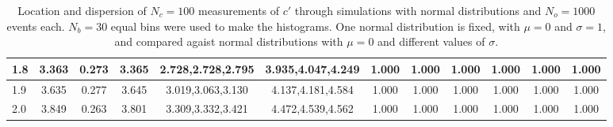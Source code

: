 \begin{table*}[h!]
\begin{center}
\begin{tabular}{| l | c | c | c | c | c | c | c | c | c | c | c |}
1.8 & 3.363 & 0.273 & 3.365 & 2.728,2.728,2.795 & 3.935,4.047,4.249  & 1.000  & 1.000  & 1.000  & 1.000  & 1.000  & 1.000 \\\hline
1.9 & 3.635 & 0.277 & 3.645 & 3.019,3.063,3.130 & 4.137,4.181,4.584  & 1.000  & 1.000  & 1.000  & 1.000  & 1.000  & 1.000 \\\hline
2.0 & 3.849 & 0.263 & 3.801 & 3.309,3.332,3.421 & 4.472,4.539,4.562  & 1.000  & 1.000  & 1.000  & 1.000  & 1.000  & 1.000 \\\hline
\end{tabular}
\caption{Location and dispersion of $N_c=100$
measurements of $c'$ through simulations
with normal distributions and $N_o=1000$ events each.
$N_b=30$ equal bins were used to make the histograms.
One normal distribution is fixed, with $\mu=0$ and $\sigma=1$,
and compared agaist normal distributions with $\mu=0$
and different values of $\sigma$.}
\end{center}
\end{table*}